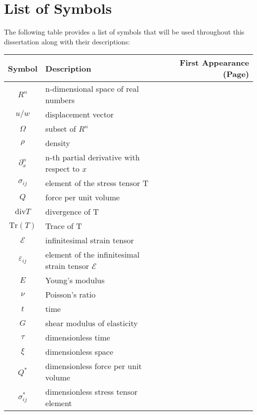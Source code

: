 \documentclass[main.tex]{subfiles}
\begin{document}
\chapter*{List of Symbols}

The following table provides a list of symbols that will be used throughout this dissertation along with their descriptions:

\noindent
\begin{tabularx}{\textwidth}{cXr}
\toprule
Symbol & Description & First Appearance (Page) \\ 
\midrule
\endhead %
\( R^n \) & n-dimensional space of real numbers & \pageref{sym:Rn} \\
\( u/w \) & displacement vector & \pageref{sym:u} \\
\( \Omega \) & subset of $R^n$ & \pageref{sym:Omega} \\
\( \rho \) & density & \pageref{sym:rho} \\
\( \partial_x^n \) & n-th partial derivative with respect to $x$ & \pageref{sym:partial_diff} \\
\( \sigma_{ij} \) & element of the stress tensor T & \pageref{sym:sigmaij} \\
\( Q \) & force per unit volume & \pageref{sym:Q} \\
\( \textrm{div}T \) & divergence of T & \pageref{sym:divT} \\
\( \textrm{Tr}(T) \) & Trace of T & \pageref{sym:TrT} \\
\( \mathcal{E} \) & infinitesimal strain tensor & \pageref{sym:mathcalE} \\
\( \varepsilon_{ij} \) & element of the infinitesimal strain tensor $\mathcal{E}$ & \pageref{sym:varepsilonij} \\
\( E \) & Young's modulus & \pageref{sym:E} \\
\( \nu \) & Poisson's ratio & \pageref{sym:nu} \\
\( t \) & time & \pageref{sym:t} \\
\( G \) & shear modulus of elasticity & \pageref{sym:G} \\
\( \tau \) & dimensionless time & \pageref{sym:tau} \\
\( \xi \) & dimensionless space & \pageref{sym:xi} \\
\( Q^* \) & dimensionless force per unit volume & \pageref{sym:Qstar} \\
\( \sigma^*_{ij} \) & dimensionless stress tensor element & \pageref{sym:sigmaijstar} \\

\end{tabularx}
\end{document}
